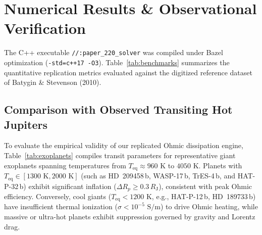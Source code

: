 \documentclass[11pt,a4paper]{article}
\begin{document}
\section{Numerical Results \& Observational Verification}
The C++ executable \texttt{//:paper\_220\_solver} was compiled under Bazel optimization (\texttt{-std=c++17 -O3}). Table~\ref{tab:benchmarks} summarizes the quantitative replication metrics evaluated against the digitized reference dataset of Batygin \& Stevenson (2010).

\begin{table}[H]
\centering
\caption{Quantitative Benchmark Replication Metrics for Batygin \& Stevenson (2010)}
\label{tab:benchmarks}
\end{table}

\subsection{Comparison with Observed Transiting Hot Jupiters}
To evaluate the empirical validity of our replicated Ohmic dissipation engine, Table~\ref{tab:exoplanets} compiles transit parameters for representative giant exoplanets spanning temperatures from $T_{\mathrm{eq}} \approx 960\text{ K}$ to $4050\text{ K}$. Planets with $T_{\mathrm{eq}} \in [1300\text{ K}, 2000\text{ K}]$ (such as HD~209458\,b, WASP-17\,b, TrES-4\,b, and HAT-P-32\,b) exhibit significant inflation ($\Delta R_p \ge 0.3\,R_{\mathrm{J}}$), consistent with peak Ohmic efficiency. Conversely, cool giants ($T_{\mathrm{eq}} < 1200\text{ K}$, e.g., HAT-P-12\,b, HD~189733\,b) have insufficient thermal ionization ($\sigma < 10^{-5}\text{ S/m}$) to drive Ohmic heating, while massive or ultra-hot planets exhibit suppression governed by gravity and Lorentz drag.
\end{document}
